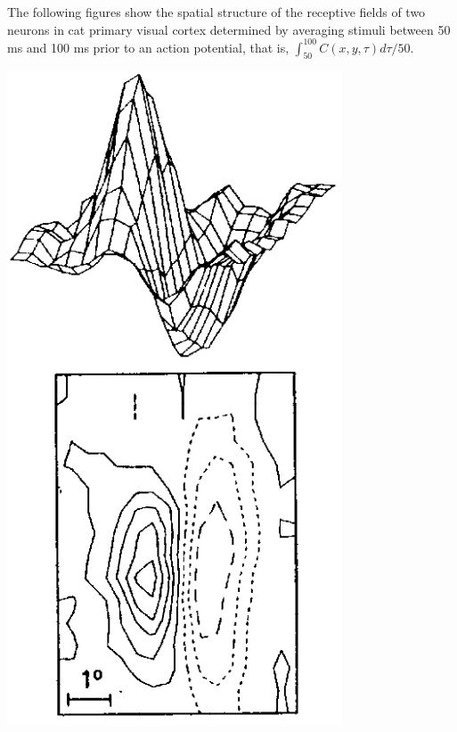 \begin{exm}
  \label{exm:spatialExm}
  The following figures show the spatial structure of the receptive fields of two neurons in cat primary visual cortex determined by averaging stimuli between 50 ms and 100 ms prior to an action potential, that is, $\int_{50}^{100}C(x,y,\tau)d\tau/50$.
  \begin{center}
    \includegraphics[scale=0.2]{./png/spatialExm1}

\end{center}
\end{exm}
